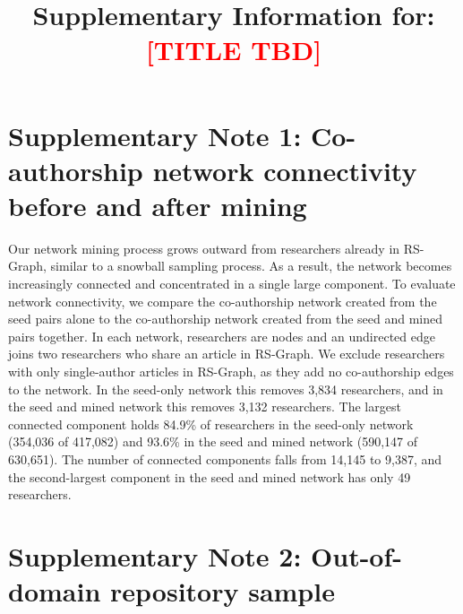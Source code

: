\documentclass[pdflatex,sn-nature]{sn-jnl}%
\begin{document}
\title{Supplementary Information for: \textcolor{red}{[TITLE TBD]}}

\author*[1]{ }

\author[1]{ }


\maketitle


\section*{Supplementary Note 1: Co-authorship network connectivity before and after mining}\label{snote:network}

Our network mining process grows outward from researchers already in RS-Graph, similar to a snowball sampling process.
As a result, the network becomes increasingly connected and concentrated in a single large component.
To evaluate network connectivity, we compare the co-authorship network created from the seed pairs alone to the co-authorship network created from the seed and mined pairs together.
In each network, researchers are nodes and an undirected edge joins two researchers who share an article in RS-Graph.
We exclude researchers with only single-author articles in RS-Graph, as they add no co-authorship edges to the network. In the seed-only network this removes 3,834 researchers, and in the seed and mined network this removes 3,132 researchers.
The largest connected component holds 84.9\% of researchers in the seed-only network (354,036 of 417,082) and 93.6\% in the seed and mined network (590,147 of 630,651).
The number of connected components falls from 14,145 to 9,387, and the second-largest component in the seed and mined network has only 49 researchers.

\section*{Supplementary Note 2: Out-of-domain repository sample}\label{snote:ood}
\end{document}
